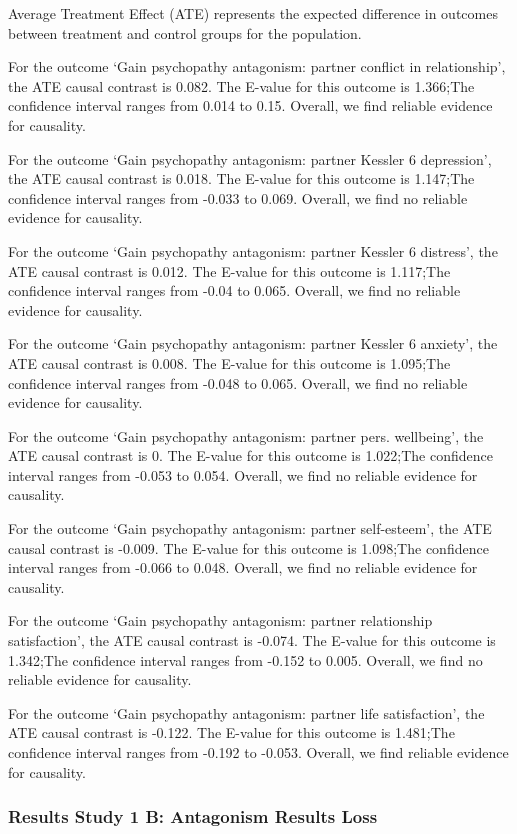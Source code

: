 \documentclass[
  singlecolumn]{article}
\begin{document}
Average Treatment Effect (ATE) represents the expected difference in
outcomes between treatment and control groups for the population.

For the outcome `Gain psychopathy antagonism: partner conflict in
relationship', the ATE causal contrast is 0.082. The E-value for this
outcome is 1.366;The confidence interval ranges from 0.014 to 0.15.
Overall, we find reliable evidence for causality.

For the outcome `Gain psychopathy antagonism: partner Kessler 6
depression', the ATE causal contrast is 0.018. The E-value for this
outcome is 1.147;The confidence interval ranges from -0.033 to 0.069.
Overall, we find no reliable evidence for causality.

For the outcome `Gain psychopathy antagonism: partner Kessler 6
distress', the ATE causal contrast is 0.012. The E-value for this
outcome is 1.117;The confidence interval ranges from -0.04 to 0.065.
Overall, we find no reliable evidence for causality.

For the outcome `Gain psychopathy antagonism: partner Kessler 6
anxiety', the ATE causal contrast is 0.008. The E-value for this outcome
is 1.095;The confidence interval ranges from -0.048 to 0.065. Overall,
we find no reliable evidence for causality.

For the outcome `Gain psychopathy antagonism: partner pers. wellbeing',
the ATE causal contrast is 0. The E-value for this outcome is 1.022;The
confidence interval ranges from -0.053 to 0.054. Overall, we find no
reliable evidence for causality.

For the outcome `Gain psychopathy antagonism: partner self-esteem', the
ATE causal contrast is -0.009. The E-value for this outcome is 1.098;The
confidence interval ranges from -0.066 to 0.048. Overall, we find no
reliable evidence for causality.

For the outcome `Gain psychopathy antagonism: partner relationship
satisfaction', the ATE causal contrast is -0.074. The E-value for this
outcome is 1.342;The confidence interval ranges from -0.152 to 0.005.
Overall, we find no reliable evidence for causality.

For the outcome `Gain psychopathy antagonism: partner life
satisfaction', the ATE causal contrast is -0.122. The E-value for this
outcome is 1.481;The confidence interval ranges from -0.192 to -0.053.
Overall, we find reliable evidence for causality.

\newpage{}

\subsubsection{Results Study 1 B: Antagonism Results
Loss}\label{results-study-1-b-antagonism-results-loss}
\end{document}
